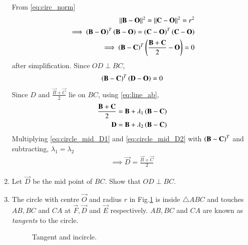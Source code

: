 \begin{enumerate}[label=\arabic*.,ref=\thesubsection.\theenumi]
\solution From \eqref{eq:circ_norm}
\begin{align}
\lVert\mathbf{B}-\mathbf{O}\rVert^2=\lVert\mathbf{C}-\mathbf{O}\rVert^2=r^2
\\
 \implies \left(\mathbf{B}-\mathbf{O}\right)^T\left(\mathbf{B}-\mathbf{O}\right) = 
\left(\mathbf{C}-\mathbf{O}\right)^T\left(\mathbf{C}-\mathbf{O}\right) 
\\
 \implies \left(\mathbf{B}-\mathbf{C}\right)^T\left(\frac{\mathbf{B}+\mathbf{C}}{2} - 
\mathbf{O}\right)  = 0
\label{eq:circle_mid}
\end{align}
after simplification. Since $OD \perp BC$,
\begin{align}
\left(\mathbf{B}-\mathbf{C}\right)^T\left(\mathbf{D}-\mathbf{O}\right) = 0 
\label{eq:circle_D}
\end{align}
Since $D$ and $\frac{\vec{B}+\vec{C}}{2}$ lie on $BC$, using 
\eqref{eq:line_ab},
\begin{align}
\label{eq:circle_mid_D1}
\frac{\mathbf{B}+\mathbf{C}}{2}
&= \mathbf{B}+ \lambda_1\left(\mathbf{B}-\mathbf{C}\right)
\\
\mathbf{D}
&= \mathbf{B}+ \lambda_2\left(\mathbf{B}-\mathbf{C}\right)
\label{eq:circle_mid_D2}
\end{align}
Multiplying \eqref{eq:circle_mid_D1} and \eqref{eq:circle_mid_D2} with 
$\left(\mathbf{B}-\mathbf{C}\right)^T$ and subtracting, $\lambda_1=\lambda_2$
%
\begin{align}
\implies \vec{D} = \frac{\vec{B}+\vec{C}}{2}
\label{eq:circle_bisect}
\end{align}
%
\item Let  $\vec{D}$ be the mid point of $BC$.  Show that $OD \perp BC$.
%
\item The circle with centre $\vec{O}$ and radius $r$ in Fig.\ref{fig:ang_bisect}	
 is inside 
$\triangle ABC$ and touches $AB, BC$ 
and $CA$ at $\vec{F}, \vec{D}$ and $\vec{E}$ respectively. $AB, BC$ and 
$CA$ are known as {\em tangents} to the circle.
\begin{figure}[!ht]
	\begin{center}
		
		\resizebox{\columnwidth}{!}{}
	\end{center}
	\caption{Tangent and incircle.}
	\label{fig:ang_bisect}	
\end{figure}



\end{enumerate}
